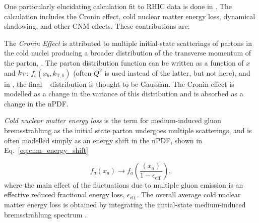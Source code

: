 One particularly elucidating calculation fit to RHIC data is done in \cite{Kang2012}. The calculation includes the Cronin effect, cold nuclear matter energy loss, dynamical shadowing, and other CNM effects. These contributions are: 

The \textit{Cronin Effect} is attributed to multiple initial-state scatterings of partons in the cold nuclei producing a broader distribution of the transverse momentum of the parton, \kt. The parton distribution function can be written as a function of $x$ and  $k_\mathrm{T}$: $f_{b}(x_b,k_{\mathrm{T},b})$ (often $Q^2$ is used instead of the latter, but not here), and in \cite{Kang2012}, the final \kt~ distribution is thought to be Gaussian. The Cronin effect is modelled as a change in the variance of this distribution and is absorbed as a change in the nPDF.

\textit{Cold nuclear matter energy loss} is the term for medium-induced gluon bremsstrahlung as the initial state parton undergoes multiple scatterings, and is often modelled simply as an energy shift in the nPDF, shown in Eq.~\ref{eq:cnm_energy_shift}

  \begin{equation}
    f_{a}(x_a) \rightarrow f_{a}(\frac{(x_a)}{1-\epsilon_\mathrm{eff.}}),
    \label{eq:cnm_energy_shift}
  \end{equation}
where the main effect of the fluctuations due to multiple gluon emission is an effective reduced fractional energy loss, $\epsilon_\mathrm{eff.}$. The overall average cold nuclear matter energy loss is obtained by integrating the initial-state medium-induced bremsstrahlung spectrum \cite{Vitev2007}. 

